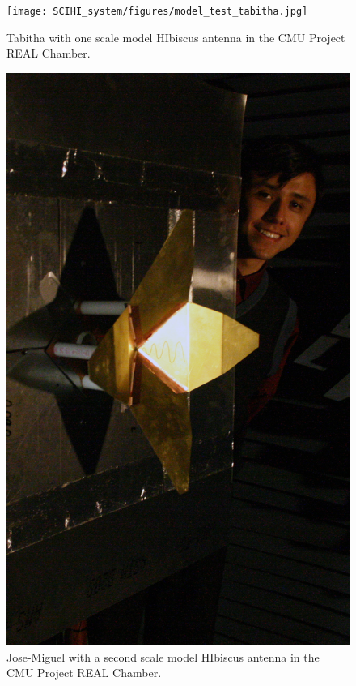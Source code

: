 \begin{figure}[htb]
\centering
\begin{minipage}[b]{0.47\textwidth}
\centering
\texttt{[image: SCIHI\_system/figures/model\_test\_tabitha.jpg]}
\caption{Tabitha with one scale model HIbiscus antenna in the CMU Project REAL Chamber. }
\label{Fig:hibiscus_scale_tabitha}
\end{minipage}%
\begin{minipage}[b]{0.02\textwidth}
\hspace{1cm}
\end{minipage}%
\begin{minipage}[b]{0.47\textwidth}
\centering
\includegraphics[width=0.9\linewidth]{SCIHI_system/figures/model_test_jose.jpg}
\caption{Jose-Miguel with a second scale model HIbiscus antenna in the CMU Project REAL Chamber.} 
\label{Fig:hibiscus_scale_jose}
\end{minipage}
\end{figure}
 
